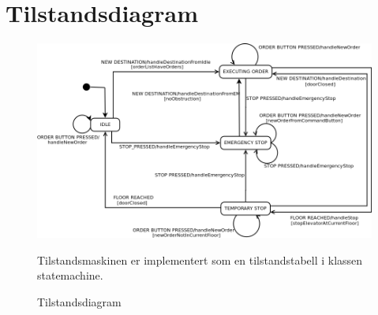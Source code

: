 \section{Tilstandsdiagram}
\begin{figure}
\centering
\label{tilstandsdiagram}
\includegraphics[width=\textwidth]{grafikk/tilstandsdiagram.png}
\caption{Tilstandsdiagram}
Tilstandsmaskinen er implementert som en tilstandstabell i klassen statemachine. 

\end{figure}
